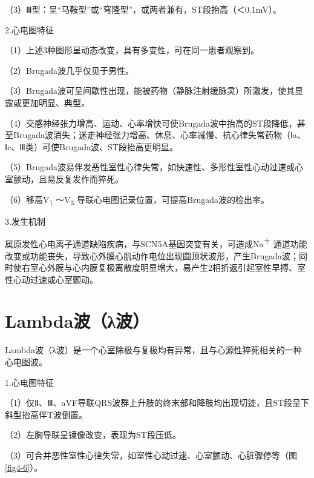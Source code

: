 （3）Ⅲ型：呈“马鞍型”或“穹隆型”，或两者兼有，ST段抬高（＜0.1mV）。

2.心电图特征

（1）上述3种图形呈动态改变，具有多变性，可在同一患者观察到。

（2）Brugada波几乎仅见于男性。

（3）Brugada波可呈间歇性出现，能被药物（静脉注射缓脉灵）所激发，使其显露或更加明显、典型。

（4）交感神经张力增高、运动、心率增快可使Brugada波中抬高的ST段降低，甚至Brugada波消失；迷走神经张力增高、休息、心率减慢、抗心律失常药物（Ⅰa、Ⅰc、Ⅲ类）可使Brugada波、ST段抬高更明显。

（5）Brugada波易伴发恶性室性心律失常，如快速性、多形性室性心动过速或心室颤动，且易反复发作而猝死。

（6）移高V\textsubscript{1} ～V\textsubscript{3}
导联心电图记录位置，可提高Brugada波的检出率。

3.发生机制

属原发性心电离子通道缺陷疾病，与SCN5A基因突变有关，可造成Na\textsuperscript{＋}
通道功能改变或功能丧失，导致心外膜心肌动作电位出现圆顶状波形，产生Brugada波；同时使右室心外膜与心内膜复极离散度明显增大，易产生2相折返引起室性早搏、室性心动过速或心室颤动。

\protect\hypertarget{text00010.htmlux5cux23subid72}{}{}

\section{Lambda波（λ波）}

Lambda波（λ波）是一个心室除极与复极均有异常，且与心源性猝死相关的一种心电图波。

1.心电图特征

（1）仅Ⅱ、Ⅲ、aVF导联QRS波群上升肢的终末部和降肢均出现切迹，且ST段呈下斜型抬高伴T波倒置。

（2）左胸导联呈镜像改变，表现为ST段压低。

（3）可合并恶性室性心律失常，如室性心动过速、心室颤动、心脏骤停等（图\ref{fig4-6}）。

